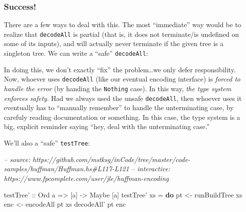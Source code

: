 \documentclass[]{article}
\newenvironment{Shaded}{}{}
\newcommand{\CommentTok}[1]{\textcolor[rgb]{0.38,0.63,0.69}{\textit{#1}}}
\newcommand{\DataTypeTok}[1]{\textcolor[rgb]{0.56,0.13,0.00}{#1}}
\newcommand{\FunctionTok}[1]{\textcolor[rgb]{0.02,0.16,0.49}{#1}}
\newcommand{\KeywordTok}[1]{\textcolor[rgb]{0.00,0.44,0.13}{\textbf{#1}}}
\newcommand{\NormalTok}[1]{#1}
\newcommand{\OtherTok}[1]{\textcolor[rgb]{0.00,0.44,0.13}{#1}}
\begin{document}
\hypertarget{success}{%
\subsubsection{Success!}\label{success}}

There are a few ways to deal with this. The most ``immediate'' way would be to
realize that \texttt{decodeAll} is partial (that is, it does not terminate/is
undefined on some of its inputs), and will actually never terminate if the given
tree is a singleton tree. We can write a ``safe'' \texttt{decodeAll}:

\begin{Shaded}
\end{Shaded}

In doing this, we don't exactly ``fix'' the problem\ldots{}we only defer
responsibility. Now, whoever uses \texttt{decodeAll\textquotesingle{}} (like our
eventual encoding interface) is \emph{forced to handle the error} (by handing
the \texttt{Nothing} case). In this way, \emph{the type system enforces safety}.
Had we always used the unsafe \texttt{decodeAll}, then whoever uses it
eventually has to ``manually remember'' to handle the unterminating case, by
carefuly reading documentation or something. In this case, the type system is a
big, explicit reminder saying ``hey, deal with the unterminating case.''

We'll also a ``safe'' \texttt{testTree}:

\begin{Shaded}
\begin{Highlighting}[]
\CommentTok{-- source: https://github.com/mstksg/inCode/tree/master/code-samples/huffman/Huffman.hs#L117-L121}
\CommentTok{-- interactive: https://www.fpcomplete.com/user/jle/huffman-encoding}

\OtherTok{testTree' ::} \DataTypeTok{Ord}\NormalTok{ a }\OtherTok{=>}\NormalTok{ [a] }\OtherTok{->} \DataTypeTok{Maybe}\NormalTok{ [a]}
\NormalTok{testTree' xs }\FunctionTok{=} \KeywordTok{do}
\NormalTok{    pt  }\OtherTok{<-}\NormalTok{ runBuildTree xs}
\NormalTok{    enc }\OtherTok{<-}\NormalTok{ encodeAll pt xs}
\NormalTok{    decodeAll' pt enc}
\end{Highlighting}
\end{Shaded}
\end{document}
